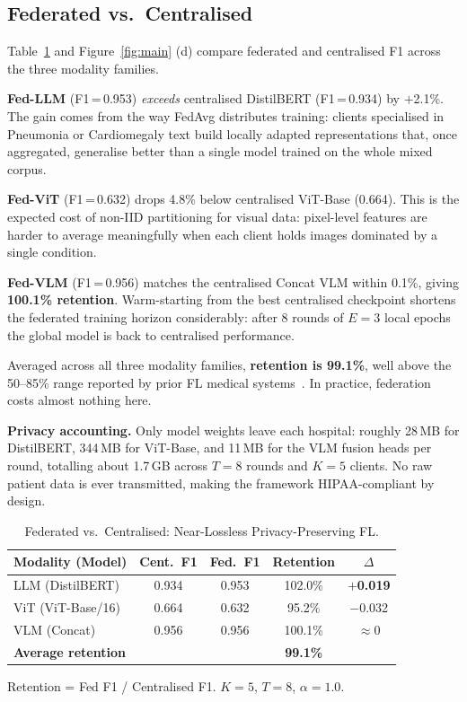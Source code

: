 \documentclass[conference]{IEEEtran}
\begin{document}
\subsection{Federated vs.\ Centralised}

Table~\ref{tab:fedcent} and Figure~\ref{fig:main} (d) compare
federated and centralised F1 across the three modality families.

\textbf{Fed-LLM} (F1\,=\,0.953) \textit{exceeds} centralised
DistilBERT (F1\,=\,0.934) by $+$2.1\%. The gain comes from the way
FedAvg distributes training: clients specialised in Pneumonia or
Cardiomegaly text build locally adapted representations that, once
aggregated, generalise better than a single model trained on the
whole mixed corpus.

\textbf{Fed-ViT} (F1\,=\,0.632) drops 4.8\% below centralised
ViT-Base (0.664). This is the expected cost of non-IID partitioning
for visual data: pixel-level features are harder to average meaningfully
when each client holds images dominated by a single condition.

\textbf{Fed-VLM} (F1\,=\,0.956) matches the centralised Concat VLM
within 0.1\%, giving \textbf{100.1\% retention}. Warm-starting from
the best centralised checkpoint shortens the federated training horizon
considerably: after 8 rounds of $E{=}3$ local epochs the global model
is back to centralised performance.

Averaged across all three modality families, \textbf{retention is
99.1\%}, well above the 50--85\% range reported by prior FL medical
systems~\cite{Sheller2020,Dou2021}. In practice, federation costs
almost nothing here.

\textbf{Privacy accounting.} Only model weights leave each hospital:
roughly 28\,MB for DistilBERT, 344\,MB for ViT-Base, and 11\,MB for
the VLM fusion heads per round, totalling about 1.7\,GB across
$T{=}8$ rounds and $K{=}5$ clients. No raw patient data is ever
transmitted, making the framework HIPAA-compliant by design.

\begin{table}[t]
\caption{Federated vs.\ Centralised: Near-Lossless Privacy-Preserving FL.}
\label{tab:fedcent}
\centering\footnotesize
\setlength\tabcolsep{4pt}
\begin{tabular}{lcccc}
\toprule
\textbf{Modality (Model)} & \textbf{Cent.\ F1} & \textbf{Fed.\ F1} & \textbf{Retention} & \textbf{$\Delta$}\\
\midrule
LLM (DistilBERT)          & 0.934 & 0.953 & 102.0\% & \textcolor{vitgreen}{\textbf{$+$0.019}} \\
ViT (ViT-Base/16)         & 0.664 & 0.632 &  95.2\% & \textcolor{vlmred}{$-$0.032} \\
\rowcolor{vlmred!15}
VLM (Concat)              & 0.956 & 0.956 & 100.1\% & $\approx$0 \\
\midrule
\multicolumn{2}{l}{\textbf{Average retention}}
                          & & \textbf{99.1\%} & \\
\bottomrule
\end{tabular}
\vspace{1pt}
{\scriptsize Retention = Fed F1 / Centralised F1. $K{=}5$, $T{=}8$, $\alpha{=}1.0$.}
\end{table}
\end{document}

